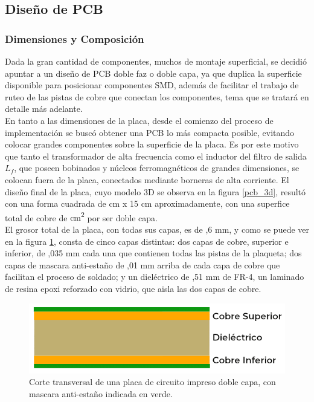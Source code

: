 \subsection{Diseño de PCB}

\subsubsection{Dimensiones y Composición}

Dada la gran cantidad de componentes, muchos de montaje superficial, se decidió apuntar a un diseño de PCB {\Medium doble faz o doble capa}, ya que duplica la superficie disponible para posicionar componentes SMD, además de facilitar el trabajo de ruteo de las pistas de cobre que conectan los componentes, tema que se tratará en detalle más adelante.\\

En tanto a las dimensiones de la placa, desde el comienzo del proceso de implementación se buscó obtener una PCB lo más compacta posible, evitando colocar grandes componentes sobre la superficie de la placa. Es por este motivo que tanto el transformador de alta frecuencia como el inductor del filtro de salida $L_f$, que poseen bobinados y núcleos ferromagnéticos de grandes dimensiones, se colocan fuera de la placa, conectados mediante borneras de alta corriente. El diseño final de la placa, cuyo modelo 3D se observa en la figura \ref{pcb_3d}, resultó con una forma cuadrada de { cm x 15 cm} aproximadamente, con una superfice total de cobre de { cm\textsuperscript{2}} por ser doble capa.\\

El grosor total de la placa, con todas sus capas, es de {,6 mm}, y como se puede ver en la figura \ref{doble_capa}, consta de cinco capas distintas: dos capas de cobre, superior e inferior, de {,035 mm} cada una que contienen todas las pistas de la plaqueta; dos capas de mascara anti-estaño de {,01 mm} arriba de cada capa de cobre que facilitan el proceso de soldado; y un dieléctrico de {,51 mm de FR-4}, un laminado de resina epoxi reforzado con vidrio, que aisla las dos capas de cobre.\\

\begin{figure}[h]
    \centering
    \includegraphics[scale=0.4]{Imagenes/Perfil Doble Capa.png}
    \caption{Corte transversal de una placa de circuito impreso doble capa, con mascara anti-estaño indicada en verde.}
    \label{doble_capa}
\end{figure}

